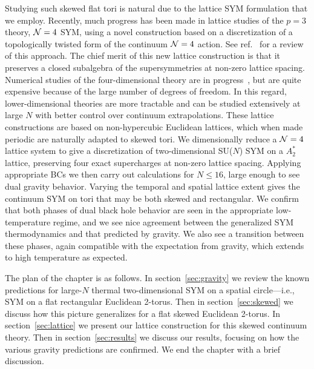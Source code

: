 Studying such skewed flat tori is natural due to the lattice SYM formulation that we employ.
Recently, much progress has been made in lattice studies of the $p = 3$ theory, $\mathcal N = 4$ SYM, using a novel construction based on a discretization of a topologically twisted form of the continuum $\mathcal N = 4$ action.
See ref.~\cite{Catterall:2009it} for a review of this approach.
The chief merit of this new lattice construction is that it preserves a closed subalgebra of the supersymmetries at non-zero lattice spacing.
Numerical studies of the four-dimensional theory are in progress~\cite{Catterall:2014vka, Schaich:2014pda, Catterall:2014vga}, but are quite expensive because of the large number of degrees of freedom.
In this regard, lower-dimensional theories are more tractable and can be studied extensively at large $N$ with better control over continuum extrapolations.
These lattice constructions are based on non-hypercubic Euclidean lattices, which when made periodic are naturally adapted to skewed tori.
We dimensionally reduce a $\mathcal N = 4$ lattice system to give a discretization of two-dimensional SU($N$) SYM on a $A_2^*$ lattice, preserving four exact supercharges at non-zero lattice spacing.
Applying appropriate BCs we then carry out calculations for $N \le 16$, large enough to see dual gravity behavior.
Varying the temporal and spatial lattice extent gives the continuum SYM on tori that may be both skewed and rectangular.
We confirm that both phases of dual black hole behavior are seen in the appropriate low-temperature regime, and we see nice agreement between the generalized SYM thermodynamics and that predicted by gravity.
We also see a transition between these phases, again compatible with the expectation from gravity, which extends to high temperature as expected.

The plan of the chapter is as follows.
In section~\ref{sec:gravity} we review the known predictions for large-$N$ thermal two-dimensional SYM on a spatial circle---i.e., SYM on a flat rectangular Euclidean 2-torus.
Then in section~\ref{sec:skewed} we discuss how this picture generalizes for a flat skewed Euclidean 2-torus.
In section~\ref{sec:lattice} we present our lattice construction for this skewed continuum theory.
Then in section~\ref{sec:results} we discuss our results, focusing on how the various gravity predictions are confirmed.
We end the chapter with a brief discussion.

